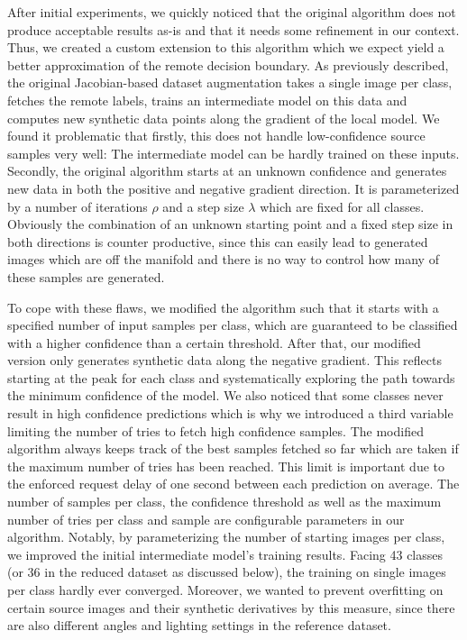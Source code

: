 After initial experiments, we quickly noticed that the original algorithm does not produce acceptable results as-is and that it needs some refinement in our context.
Thus, we created a custom extension to this algorithm which we expect yield a better approximation of the remote decision boundary.
As previously described, the original Jacobian-based dataset augmentation takes a single image per class, fetches the remote labels, trains an intermediate model on this data and computes new synthetic data points along the gradient of the local model.
We found it problematic that firstly, this does not handle low-confidence source samples very well: The intermediate model can be hardly trained on these inputs.
Secondly, the original algorithm starts at an unknown confidence and generates new data in both the positive and negative gradient direction.
It is parameterized by a number of iterations $\rho$ and a step size $\lambda$ which are fixed for all classes.
Obviously the combination of an unknown starting point and a fixed step size in both directions is counter productive, since this can easily lead to generated images which are off the manifold and there is no way to control how many of these samples are generated.

To cope with these flaws, we modified the algorithm such that it starts with a specified number of input samples per class, which are guaranteed to be classified with a higher confidence than a certain threshold.
After that, our modified version only generates synthetic data along the negative gradient.
This reflects starting at the peak for each class and systematically exploring the path towards the minimum confidence of the model.
We also noticed that some classes never result in high confidence predictions which is why we introduced a third variable limiting the number of tries to fetch high confidence samples.
The modified algorithm always keeps track of the best samples fetched so far which are taken if the maximum number of tries has been reached.
This limit is important due to the enforced request delay of one second between each prediction on average.
The number of samples per class, the confidence threshold as well as the maximum number of tries per class and sample are configurable parameters in our algorithm.
Notably, by parameterizing the number of starting images per class, we improved the initial intermediate model's training results. 
Facing 43 classes (or 36 in the reduced dataset as discussed below), the training on single images per class hardly ever converged.
Moreover, we wanted to prevent overfitting on certain source images and their synthetic derivatives by this measure, since there are also different angles and lighting settings in the reference dataset.

